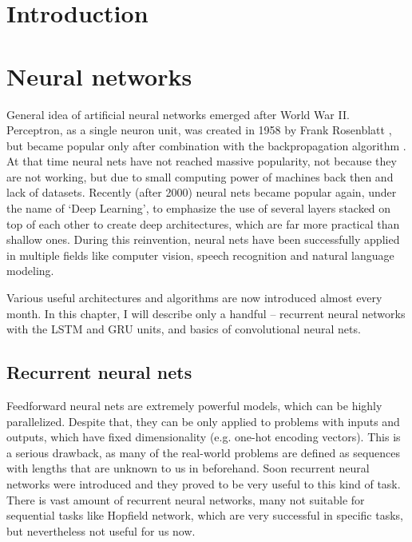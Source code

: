 
\chapter{Introduction}

\chapter{Neural networks} 
General idea of artificial neural networks emerged after World War II. Perceptron, as a single neuron unit, was created in 1958 by Frank Rosenblatt \cite{rosenblatt58a}, but became popular only after combination with the backpropagation algorithm \cite{bryson1975applied,werbos1974beyond}. At that time neural nets have not reached massive popularity, not because they are not working, but due to small computing power of machines back then and lack of datasets. Recently (after 2000) neural nets became popular again, under the name of \textquoteleft Deep Learning\textquoteright, to emphasize the use of several layers stacked on top of each other to create deep architectures, which are far more practical than shallow ones. During this reinvention, neural nets have been successfully applied in multiple fields like computer vision, speech recognition and natural language modeling.

Various useful architectures and algorithms are now introduced almost every month. In this chapter, I will describe only a handful -- recurrent neural networks with the LSTM and GRU units, and basics of convolutional neural nets.

	\section{Recurrent neural nets}
Feedforward neural nets are extremely powerful models, which can be highly parallelized. Despite that, they can be only applied to problems with inputs and outputs, which have fixed dimensionality (e.g. one-hot encoding vectors). This is a serious drawback, as many of the real-world problems are defined as sequences with lengths that are unknown to us in beforehand. Soon recurrent neural networks were introduced and they proved to be very useful to this kind of task. There is vast amount of recurrent neural networks, many not suitable for sequential tasks like Hopfield network, which are very successful in specific tasks, but nevertheless not useful for us now.

